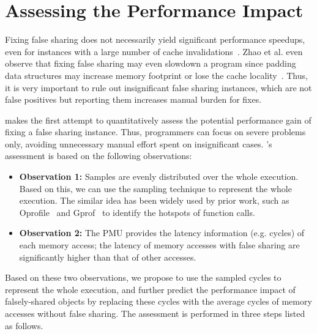 \section{Assessing the Performance Impact}

\label{sec:predictimprove}
Fixing false sharing does not necessarily yield significant performance speedups, even for instances with a large number of cache invalidations~\cite{Sheriff, Predator}. Zhao et al. even observe that fixing false sharing may even slowdown a program since padding data structures may increase memory footprint or lose the cache locality~\cite{qinzhao}. Thus, it is very important to rule out insignificant false sharing instances, which are not false positives but reporting them increases manual burden for fixes.

\cheetah{} makes the first attempt to quantitatively assess the potential performance gain of fixing a false sharing instance. Thus, programmers can focus on severe problems only, avoiding unnecessary manual effort spent on insignificant cases.
\cheetah{}'s assessment is based on the following observations:

\begin{itemize}
\item {\bf Observation 1:} Samples are evenly distributed over the whole execution. Based on this, we can use the sampling technique to represent the whole execution. The similar idea has been widely used by prior work, such as Oprofile~\cite{oprofile} and Gprof~\cite{DBLP:conf/sigplan/GrahamKM82} to identify the hotspots of function calls.

\item {\bf Observation 2:} The PMU provides the latency information (e.g. cycles) of each memory access; the latency of memory accesses with false sharing are significantly higher than that of other accesses. 

\end{itemize}

Based on these two observations, we propose to use the sampled cycles to represent the whole execution, and further predict the performance impact of falsely-shared objects by replacing these cycles with the average cycles of memory accesses without false sharing. The assessment is performed in three steps listed as follows. 

